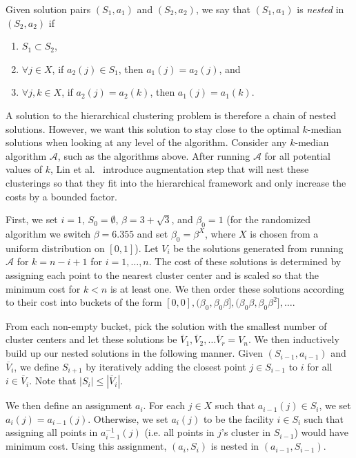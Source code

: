 \documentclass{article}
\begin{document}
Given solution pairs $(S_1, a_1)$ and $(S_2, a_2)$, we say that $(S_1, a_1)$ is \emph{nested} in $(S_2, a_2)$ if 
\begin{enumerate}
\item $S_1 \subset S_2$, 
\item  $\forall  j \in X$, if $a_2(j) \in S_1$, then $a_1(j) = a_2(j)$, and 
\item $\forall j, k \in X$, if $a_2(j) = a_2(k)$, then $a_1(j) = a_1(k)$.
\end{enumerate}
 A solution to the hierarchical clustering problem is therefore a chain of nested solutions. However, we want this solution to stay close to the optimal $k$-median solutions when looking at any level of the algorithm.  
Consider any $k$-median algorithm $\mathcal{A}$, such as the algorithms above. After running $\mathcal{A}$ for all potential values of $k$, Lin et al.~\cite{Lin} introduce  augmentation step that will nest these clusterings so that they fit into the hierarchical framework and only increase the costs by a bounded factor. 

First, we set $i=1$, $S_0 = \emptyset$, $\beta = 3+\sqrt{3}$, and $\beta_0 = 1$ (for the randomized algorithm we switch $\beta = 6.355$ and set $\beta_0 = \beta^X$, where $X$ is chosen from a uniform distribution on $[0,1]$). Let $V_i$ be the solutions generated from running $\mathcal{A}$ for $k=n-i+1$ for $i=1, \ldots, n$. The cost of these solutions is determined by assigning each point to the nearest cluster center and is scaled so that the minimum cost for $k<n$ is at least one. We then order these solutions according to their cost into buckets of the form $[0,0], (\beta_0, \beta_0 \beta], (\beta_0 \beta, \beta_0 \beta^2], \ldots $. 

From each non-empty bucket, pick the solution with the smallest number of cluster centers and let these solutions be $\overline{V}_1, \overline{V}_2, \ldots \overline{V}_r = V_n$. We then inductively build up our nested solutions in the following manner. Given $(S_{i-1}, a_{i-1})$ and $\overline{V}_i$, we define $S_{i+1}$ by iteratively adding the closest point $j \in S_{i-1}$ to $i$ for all $i \in \overline{V}_i$. Note that $|S_{i}| \leq |\overline{V}_i|$. 

We then define an assignment $a_i$. For each $j \in X$ such that $a_{i-1}(j) \in S_{i}$, we set $a_i(j) = a_{i-1}(j)$. Otherwise, we set $a_i(j)$ to be the facility $i \in S_i$ such that assigning all points in $a_{i-1}^{-1}(j)$ (i.e. all points in $j$'s cluster in $S_{i-1}$) would have minimum cost. Using this assignment, $(a_i, S_i)$ is nested in $(a_{i-1}, S_{i-1})$. 
\end{document}

